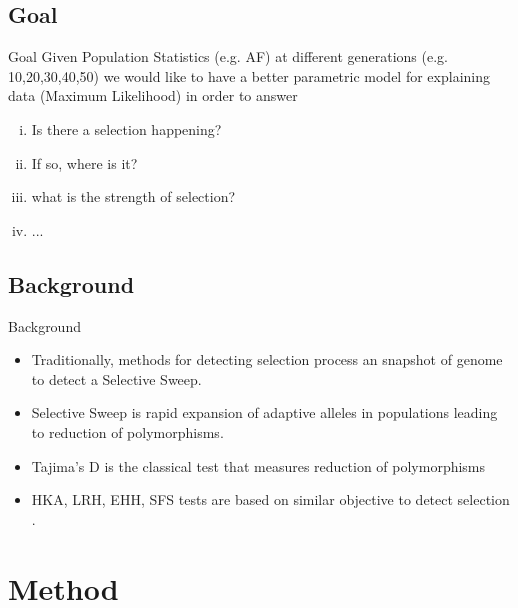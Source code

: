 \documentclass[t]{beamer} %
\begin{document}
\subsection{Goal}
\begin{frame}{Goal}
Given Population Statistics (e.g. AF) at different generations (e.g. 10,20,30,40,50) we would like to have a better parametric model for explaining data (Maximum Likelihood) in order to answer

\begin{enumerate}[(i)]
\item Is there a selection happening?
\item If so, where is it?
\item what is the strength of selection?
\item ...
\end{enumerate}
\end{frame}
\subsection{Background}
\begin{frame}{Background}
\begin{itemize}
\item Traditionally, methods for detecting selection  process an snapshot of genome to detect a Selective Sweep.
\item Selective Sweep is rapid expansion of adaptive alleles in populations leading to reduction of polymorphisms.
\item Tajima’s D is the classical test that measures reduction of polymorphisms
\item HKA, LRH, EHH, SFS tests are based on similar objective to detect selection .
\end{itemize}
\end{frame}
\section{Method}
\end{document}
